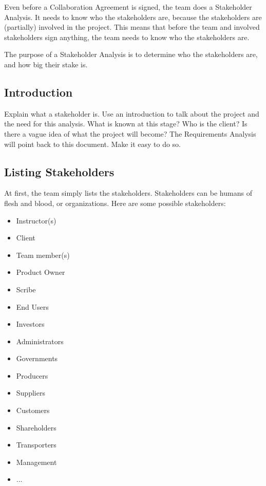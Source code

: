 \documentclass[10pt]{report}
\begin{document}
Even before a Collaboration Agreement is signed, the team does a Stakeholder Analysis. It needs to know who the stakeholders are, because the stakeholders are (partially) involved in the project. This means that before the team and involved stakeholders sign anything, the team needs to know who the stakeholders are.

\bigskip

The purpose of a Stakeholder Analysis is to determine who the stakeholders are, and how big their stake is.

\subsection{Introduction}

Explain what a stakeholder is. Use an introduction to talk about the project and the need for this analysis. What is known at this stage? Who is the client? Is there a vague idea of what the project will become? The Requirements Analysis will point back to this document. Make it easy to do so.

\subsection{Listing Stakeholders}

At first, the team simply lists the stakeholders. Stakeholders can be humans of flesh and blood, or organizations. Here are some possible stakeholders:

\begin{itemize}
	\item Instructor(s)
	\item Client
	\item Team member(s)
	\item Product Owner
	\item Scribe
	\item End Users
	\item Investors
	\item Administrators
	\item Governments
	\item Producers
	\item Suppliers
	\item Customers
	\item Shareholders
	\item Transporters
	\item Management
	\item ...
\end{itemize}
\end{document}
